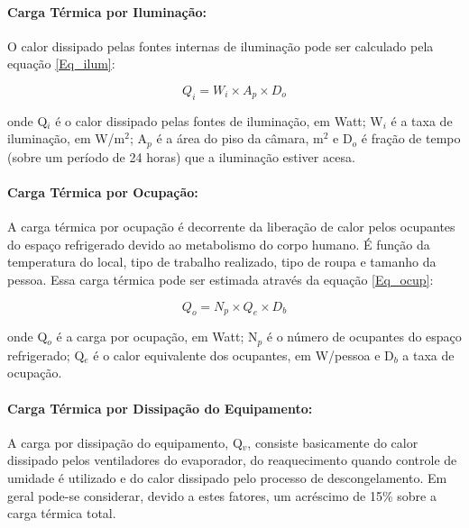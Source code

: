 \documentclass[10pt,a4paper]{article}
\begin{document}
\paragraph*{{ Carga Térmica por Iluminação:}}

O calor dissipado pelas fontes internas de iluminação pode ser calculado pela equação \ref{Eq_ilum}:

\begin{equation}
    Q_i = W_i \times A_p \times D_o
    \label{Eq_ilum}
\end{equation}

onde Q$_i$ é o calor dissipado pelas fontes de iluminação, em Watt; W$_i$ é a taxa de iluminação, em W/m$^{2}$; A$_p$ é a área do piso da câmara, m$^{2}$ e D$_o$ é fração de tempo (sobre um período de 24 horas) que a iluminação estiver acesa.

\paragraph*{{ Carga Térmica por Ocupação:}}

A carga térmica por ocupação é decorrente da liberação de calor pelos ocupantes do espaço refrigerado devido ao metabolismo do corpo humano. É função da temperatura do local, tipo de trabalho realizado, tipo de roupa e tamanho da pessoa. Essa carga térmica pode ser estimada através da equação \ref{Eq_ocup}:

\begin{equation}
    Q_o = N_p \times Q_e \times D_b
    \label{Eq_ocup}
\end{equation}

onde Q$_o$ é a carga por ocupação, em Watt; N$_p$ é o número de ocupantes do espaço refrigerado; Q$_e$ é o calor equivalente dos ocupantes, em W/pessoa e D$_b$ a taxa de ocupação.

\paragraph*{{ Carga Térmica por Dissipação do Equipamento:}}

A carga por dissipação do equipamento, Q$_v$, consiste basicamente do calor dissipado pelos ventiladores do evaporador, do reaquecimento quando controle de umidade é utilizado e do calor dissipado pelo processo de descongelamento. Em geral pode-se considerar, devido a estes fatores, um acréscimo de  15\% sobre a carga térmica total.
\end{document}
